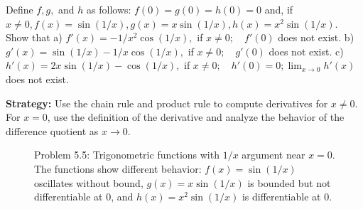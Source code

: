 \begin{problembox}
\begin{problemstatement}
Define \( f, g, \) and \( h \) as follows: \( f(0) = g(0) = h(0) = 0 \) and, if \( x \neq 0, f(x) = \sin (1/x), g(x) = x \sin (1/x), h(x) = x^2 \sin (1/x) \). Show that
a) \( f'(x) = -1/x^2 \cos (1/x), \) if \( x \neq 0; \quad f'(0) \) does not exist.
b) \( g'(x) = \sin (1/x) - 1/x \cos (1/x), \) if \( x \neq 0; \quad g'(0) \) does not exist.
c) \( h'(x) = 2x \sin (1/x) - \cos (1/x), \) if \( x \neq 0; \quad h'(0) = 0; \lim_{x \to 0} h'(x) \) does not exist.
\end{problemstatement}
\end{problembox}

\noindent\textbf{Strategy:} Use the chain rule and product rule to compute derivatives for \( x \neq 0 \). For \( x = 0 \), use the definition of the derivative and analyze the behavior of the difference quotient as \( x \to 0 \).

\begin{figure}[h]
\centering
{}
\caption{Problem 5.5: Trigonometric functions with $1/x$ argument near $x=0$. The functions show different behavior: $f(x) = \sin(1/x)$ oscillates without bound, $g(x) = x\sin(1/x)$ is bounded but not differentiable at 0, and $h(x) = x^2\sin(1/x)$ is differentiable at 0.}
\end{figure}

